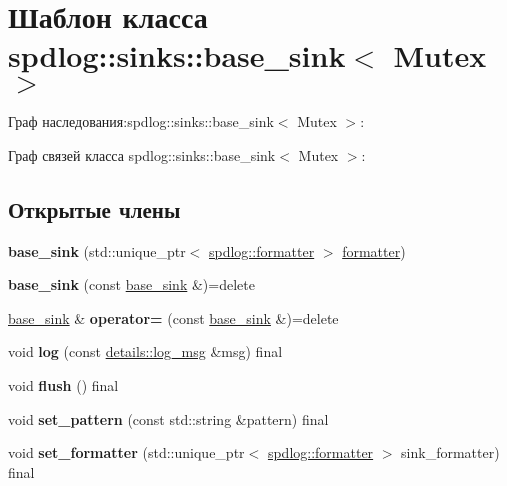\hypertarget{classspdlog_1_1sinks_1_1base__sink}{}\section{Шаблон класса spdlog\+:\+:sinks\+:\+:base\+\_\+sink$<$ Mutex $>$}
\label{classspdlog_1_1sinks_1_1base__sink}


Граф наследования\+:spdlog\+:\+:sinks\+:\+:base\+\_\+sink$<$ Mutex $>$\+:


Граф связей класса spdlog\+:\+:sinks\+:\+:base\+\_\+sink$<$ Mutex $>$\+:
\subsection*{Открытые члены}
\begin{DoxyCompactItemize}
\item 
\mbox{\label{classspdlog_1_1sinks_1_1base__sink_a1ed084e2d363c7bc8fae9e83e8a5d846}} 
{\bfseries base\+\_\+sink} (std\+::unique\+\_\+ptr$<$ \hyperlink{classspdlog_1_1formatter}{spdlog\+::formatter} $>$ \hyperlink{classspdlog_1_1formatter}{formatter})
\item 
\mbox{\label{classspdlog_1_1sinks_1_1base__sink_a9639062f2ce3598203c0d958576491d1}} 
{\bfseries base\+\_\+sink} (const \hyperlink{classspdlog_1_1sinks_1_1base__sink}{base\+\_\+sink} \&)=delete
\item 
\mbox{\label{classspdlog_1_1sinks_1_1base__sink_a1b99823aeb2513a891bba168639421a9}} 
\hyperlink{classspdlog_1_1sinks_1_1base__sink}{base\+\_\+sink} \& {\bfseries operator=} (const \hyperlink{classspdlog_1_1sinks_1_1base__sink}{base\+\_\+sink} \&)=delete
\item 
\mbox{\label{classspdlog_1_1sinks_1_1base__sink_a071c59d8dd1fa6f2241d732348bc7626}} 
void {\bfseries log} (const \hyperlink{structspdlog_1_1details_1_1log__msg}{details\+::log\+\_\+msg} \&msg) final
\item 
\mbox{\label{classspdlog_1_1sinks_1_1base__sink_a11cbe457cdd5168afee9ccf3d766e61f}} 
void {\bfseries flush} () final
\item 
\mbox{\label{classspdlog_1_1sinks_1_1base__sink_a429027faf6b705479533f448cd55a1a0}} 
void {\bfseries set\+\_\+pattern} (const std\+::string \&pattern) final
\item 
\mbox{\label{classspdlog_1_1sinks_1_1base__sink_a187a5830583db2c271999b9543df9dc1}} 
void {\bfseries set\+\_\+formatter} (std\+::unique\+\_\+ptr$<$ \hyperlink{classspdlog_1_1formatter}{spdlog\+::formatter} $>$ sink\+\_\+formatter) final
\end{DoxyCompactItemize}
